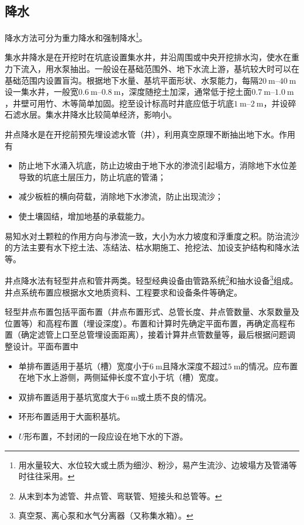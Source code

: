 \documentclass{book}
\begin{document}
\subsection{降水}
\par 降水方法可分为重力降水和强制降水\footnote{用水量较大、水位较大或土质为细沙、粉沙，易产生流沙、边坡塌方及管涌等时往往采用。}。
\par 集水井降水是在开挖时在坑底设置集水井，井沿周围或中央开挖排水沟，使水在重力下流入，用水泵抽出。一般设在基础范围外、地下水流上游，基坑较大时可以在基础范围内设置盲沟。根据地下水量、基坑平面形状、水泵能力，每隔$\SIrange{20}{40}{\m}$设一集水井，一般宽$\SIrange{0.6}{0.8}{\m}$，深度随挖土加深，通常低于挖土面$\SIrange{0.7}{1.0}{\m}$，井壁可用竹、木等简单加固。挖至设计标高时井底应低于坑底$\SIrange{1}{2}{\m}$，并设碎石滤水层。集水井降水比较简单经济，影响小。
\par 井点降水是在开挖前预先埋设滤水管（井），利用真空原理不断抽出地下水。作用有
\begin{itemize}
    \item 防止地下水涌入坑底，防止边坡由于地下水的渗流引起塌方，消除地下水位差导致的坑底土层压力，防止坑底的管涌；
    \item 减少板桩的横向荷载，消除地下水渗流，防止出现流沙；
    \item 使土壤固结，增加地基的承载能力。
\end{itemize}
\par 易知水对土颗粒的作用方向与渗流一致，大小为水力坡度和浮重度之积。防治流沙的方法主要有水下挖土法、冻结法、枯水期施工、抢挖法、加设支护结构和降水法等。
\par 井点降水法有轻型井点和管井两类。轻型经典设备由管路系统\footnote{从末到本为滤管、井点管、弯联管、短接头和总管等。}和抽水设备\footnote{真空泵、离心泵和水气分离器（又称集水箱）。}组成。井点系统布置应根据水文地质资料、工程要求和设备条件等确定。
\par 轻型井点布置包括平面布置（井点布置形式、总管长度、井点管数量、水泵数量及位置等）和高程布置（埋设深度）。布置和计算时先确定平面布置，再确定高程布置（确定滤管上口至总管埋设面距离），接着计算井点管数量等，最后根据问题调整设计。平面布置中
\begin{itemize}
    \item 单排布置适用于基坑（槽）宽度小于$\SI{6}{\m}$且降水深度不超过$\SI{5}{\m}$的情况。应布置在地下水上游侧，两侧延伸长度不宜小于坑（槽）宽度。
    \item 双排布置适用于基坑宽度大于$\SI{6}{\m}$或土质不良的情况。
    \item 环形布置适用于大面积基坑。
    \item $U$形布置，不封闭的一段应设在地下水的下游。
\end{itemize}
\end{document}
